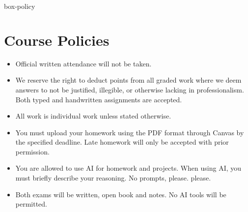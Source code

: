 \documentclass[11pt, a4paper]{article}
\def\hsm#1{{\color{blue}{#1}}}
\begin{document}
\begin{BlockClass}{box-policy}

\hypertarget{policies}{}
\section*{Course Policies}

\begin{itemize}
\item Official written attendance will not be taken. 
\item We reserve the right to deduct points from all graded work where we deem answers to not be justified, illegible, or otherwise lacking in professionalism. Both typed and handwritten assignments are accepted.
\item All work is individual work unless stated otherwise. 
\item You must upload your homework using the PDF format through Canvas by the specified deadline. Late homework will only be accepted with prior permission.
\item You are allowed to use AI for homework and projects. When using AI, you must briefly describe your reasoning. No prompts, please. please.
\item Both exams will be written, open book and notes. No AI tools will be permitted. %
\end{itemize}






\end{BlockClass}
\end{document}
